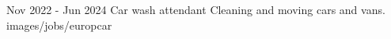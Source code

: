 {Nov 2022 - Jun 2024}
{Car wash attendant}
{Cleaning and moving cars and vans.}
{images/jobs/europcar}
